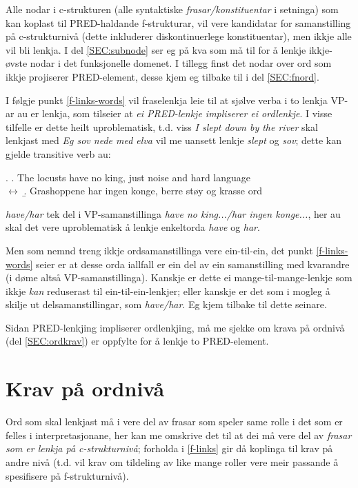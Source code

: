 \documentclass[11pt,a4paper,oneside,draft]{book}
\begin{document}
Alle nodar i c-strukturen (alle syntaktiske \emph{frasar/konstituentar} i
setninga) som kan koplast til PRED-haldande f-strukturar, vil vere
kandidatar for samanstilling på c-strukturnivå (dette inkluderer
diskontinuerlege konstituentar), men ikkje alle vil bli lenkja.  I del
\ref{SEC:subnode} ser eg på kva som må til for å lenkje ikkje-øvste
nodar i det funksjonelle domenet.
I tillegg finst det nodar over ord som ikkje projiserer PRED-element,
desse kjem eg tilbake til i del \ref{SEC:fnord}.

I følgje punkt \ref{f-links-words} vil fraselenkja leie til at sjølve
verba i to lenkja VP-ar au er lenkja, som tilseier at \emph{ei PRED-lenkje impliserer ei ordlenkje}. I visse tilfelle er dette heilt
uproblematisk, t.d. viss \emph{I slept down by the river} skal lenkjast med
\emph{Eg sov nede med elva} vil me uansett lenkje \emph{slept} og \emph{sov}; dette
kan gjelde transitive verb au:

\ex. \a. The locusts have no king, just noise and hard language\\
     $\leftrightarrow$
     \b. Grashoppene har ingen konge, berre støy og krasse ord


\emph{have/har} tek del i VP-samanstillinga \emph{have no king.../har
ingen konge...}, her au skal det vere uproblematisk å lenkje
enkeltorda \emph{have} og \emph{har}.

Men som nemnd treng ikkje ordsamanstillinga vere ein-til-ein, det
punkt \ref{f-links-words} seier er at desse orda iallfall er ein del
av ein samanstilling med kvarandre (i døme \Last altså
VP-samanstillinga). Kanskje er dette ei mange-til-mange-lenkje som
ikkje \emph{kan} reduserast til ein-til-ein-lenkjer; eller kanskje er
det som i \Last mogleg å skilje ut delsamanstillingar, som
\emph{have/har}. Eg kjem tilbake til dette
 seinare.

Sidan PRED-lenkjing impliserer ordlenkjing, må me sjekke om krava på
ordnivå (del \ref{SEC:ordkrav}) er oppfylte for å lenkje to
PRED-element. 

\section{Krav på ordnivå}
\label{sec-3.5}

\label{SEC:ordkrav}

Ord som skal lenkjast må i \cite{thunes2003eal} vere del av frasar som
speler same rolle i det som er felles i interpretasjonane, her kan me
omskrive det til at dei må vere del av \emph{frasar som er lenkja på c-strukturnivå}; forholda i \ref{f-links} gir då koplinga til krav på
andre nivå (t.d. vil krav om tildeling av like mange roller vere
meir passande å spesifisere på f-strukturnivå).
\end{document}
